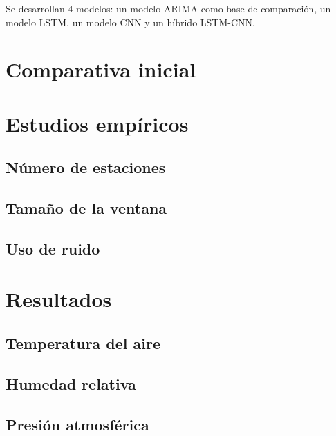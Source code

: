 Se desarrollan 4 modelos: un modelo ARIMA como base de comparación, un modelo LSTM, un modelo CNN y un híbrido LSTM-CNN.

\section{Comparativa inicial}

\section{Estudios empíricos}

\subsection{Número de estaciones}

\subsection{Tamaño de la ventana}

\subsection{Uso de ruido}

\section{Resultados}
\subsection{Temperatura del aire}
\subsection{Humedad relativa}
\subsection{Presión atmosférica}

